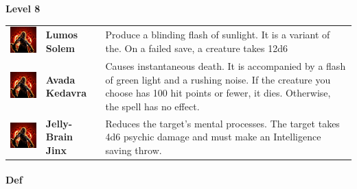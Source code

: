 \textbf{Level 8} 
\begin{tabular}{ m{4cm}m{3cm}m{6cm} } 
	\includegraphics[width=4cm]{../Pictures/Gameplay/Spells/Icon/spell_icon.png} & \textbf{Lumos Solem} & Produce a blinding flash of sunlight. It is a variant of the. On a failed save, a creature takes 12d6 \\ 
\includegraphics[width=4cm]{../Pictures/Gameplay/Spells/Icon/spell_icon.png} & \textbf{Avada Kedavra} & Causes instantaneous death. It is accompanied by a flash of green light and a rushing noise.  If the creature you choose has 100 hit points or fewer, it dies. Otherwise, the spell has no effect. \\ 
	\includegraphics[width=4cm]{../Pictures/Gameplay/Spells/Icon/spell_icon.png} & \textbf{Jelly-Brain Jinx} & Reduces the target's mental processes. The target takes 4d6 psychic damage and must make an Intelligence saving throw.\\ 
\end{tabular}

\paragraph{Def} 

